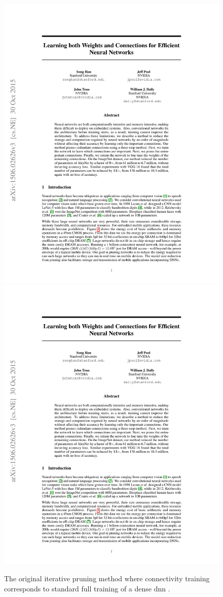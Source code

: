 \documentclass[12pt,fleqn,twocolumn]{article}
\begin{document}
\begin{figure}
    \centering
        \includegraphics[page=3, clip, trim=5cm 21.5cm 12.5cm 2.7cm, width=.8\linewidth]{pruning.pdf}
        \includegraphics[page=3, clip, trim=10cm 21.85cm 4cm 2.7cm, width=\linewidth]{pruning.pdf}
        \caption{The original iterative pruning method where connectivity training corresponds to standard full training of a dense \acrshort{dnn} \cite[Fig. 2 and 3]{han2015learning}.}
    \label{fig:pruning.pdf}
\end{figure}\noindent
\end{document}
